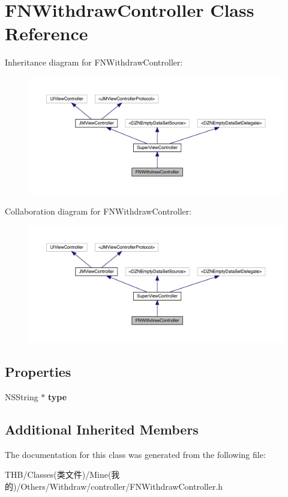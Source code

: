 \hypertarget{interface_f_n_withdraw_controller}{}\section{F\+N\+Withdraw\+Controller Class Reference}
\label{interface_f_n_withdraw_controller}


Inheritance diagram for F\+N\+Withdraw\+Controller\+:\nopagebreak
\begin{figure}[H]
\begin{center}
\leavevmode
\includegraphics[width=350pt]{interface_f_n_withdraw_controller__inherit__graph}
\end{center}
\end{figure}


Collaboration diagram for F\+N\+Withdraw\+Controller\+:\nopagebreak
\begin{figure}[H]
\begin{center}
\leavevmode
\includegraphics[width=350pt]{interface_f_n_withdraw_controller__coll__graph}
\end{center}
\end{figure}
\subsection*{Properties}
\begin{DoxyCompactItemize}
\item 
\mbox{\label{interface_f_n_withdraw_controller_a621ccf5f51f6432945275327438a3e86}} 
N\+S\+String $\ast$ {\bfseries type}
\end{DoxyCompactItemize}
\subsection*{Additional Inherited Members}


The documentation for this class was generated from the following file\+:\begin{DoxyCompactItemize}
\item 
T\+H\+B/\+Classes(类文件)/\+Mine(我的)/\+Others/\+Withdraw/controller/F\+N\+Withdraw\+Controller.\+h\end{DoxyCompactItemize}
